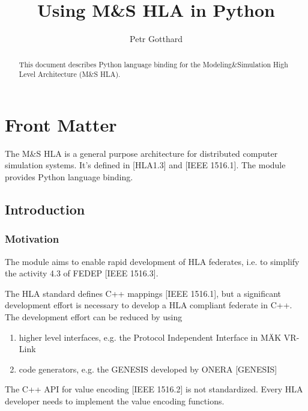 \documentclass{howto}
\title{Using M\&S HLA in Python}
\author{Petr Gotthard}
\begin{document}
\maketitle

%
\ifhtml
\chapter*{Front Matter\label{front}}
\fi


\begin{abstract}
\noindent
This document describes Python language binding for the Modeling\&Simulation
High Level Architecture (M\&S HLA).
\end{abstract}

\tableofcontents

The M\&S HLA is a general purpose architecture for distributed computer
simulation systems. It's defined in [HLA1.3] and [IEEE 1516.1].
The  module provides Python language binding.

\section{Introduction}

\subsection{Motivation}

The  module aims to enable rapid development of HLA federates,
i.e. to simplify the activity 4.3 of FEDEP [IEEE 1516.3].

The HLA standard defines C++ mappings [IEEE 1516.1], but a significant
development effort is necessary to develop a HLA compliant federate in C++.
The development effort can be reduced by using
\begin{enumerate}
\item higher level interfaces, e.g. the Protocol Independent Interface in M\"{A}K VR-Link
\item code generators, e.g. the GENESIS developed by ONERA [GENESIS]
\end{enumerate}

The C++ API for value encoding [IEEE 1516.2] is not standardized. Every HLA
developer needs to implement the value encoding functions.
\end{document}

